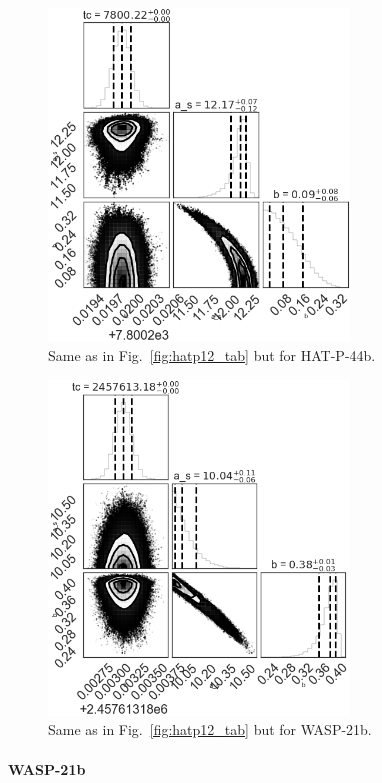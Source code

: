 \begin{figure}
\centering
	\includegraphics[width=8cm]{hatp44/joint_tc_a_b.png}
	\caption{Same as in Fig.~\ref{fig:hatp12_tab} but for HAT-P-44b.}
\label{fig:hatp44_tab}
\end{figure}

\begin{figure}
\centering
	\includegraphics[width=8cm]{wasp21/joint_tc_a_b.png}
    \caption{Same as in Fig.~\ref{fig:hatp12_tab} but for WASP-21b.}
\label{fig:wasp21_tab}
\end{figure}

\paragraph{WASP-21b}

